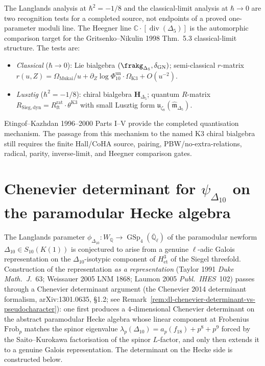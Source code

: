 \begin{remark}
\label{rem:dl-kazhdan-synthesis}
The Langlands analysis at $\hbar^2 = -1/8$ and the
classical-limit analysis at $\hbar \to 0$ are two recognition tests for
a completed source, not endpoints of a proved one-parameter moduli line.
The Heegner line $\mathbb C\cdot[\operatorname{div}(\Delta_5)]$ is the
automorphic comparison target for the Gritsenko--Nikulin 1998 Thm.~5.3
classical-limit structure. The tests are:
\begin{itemize}
 \item \emph{Classical} ($\hbar\to 0$): Lie bialgebra
 $(\frakg_{\Delta_5}, \delta_{\mathrm{GN}})$; semi-classical
 $r$-matrix $r(u, Z) = \Omega_{\mathrm{Mukai}}/u +
 \partial_Z\log\Phi_{10}^{\mathrm{un}}\cdot\Omega_{\mathrm{K3}} + O(u^{-2})$.
 \item \emph{Lusztig} ($\hbar^2 = -1/8$): chiral bialgebra
 $\mathbf H_{\Delta_5}$; quantum $R$-matrix
 $R_{\mathrm{Sieg,dyn}} = R^{\mathrm{rat}}_{\mathrm{ft}}\cdot\theta^{\mathrm{K3}}$
 with small Lusztig form
 $\mathfrak u_{\zeta_8}(\widehat{\mathfrak m}_{\Delta_5})$.
\end{itemize}
Etingof--Kazhdan 1996--2000 Parts I--V provide the completed
quantisation mechanism. The passage from this mechanism to the named
K3 chiral bialgebra still requires the finite Hall/CoHA source,
pairing, PBW/no-extra-relations, radical, parity, inverse-limit, and
Heegner comparison gates.
\end{remark}

\section{Chenevier determinant for $\psi_{\Delta_{10}}$ on the
paramodular Hecke algebra}
\label{sec:dl-gelfand-pseudocharacter}

\providecommand{\Tpar}{\mathbb{T}^{\mathrm{par}}}
\providecommand{\Sps}{D^{\mathrm{Chen}}}
\providecommand{\Gal}{\operatorname{Gal}}
\providecommand{\GSp}{\operatorname{GSp}}
\providecommand{\tr}{\operatorname{tr}}

The Langlands parameter
$\phi_{\Delta_{10}}\colon W_{\mathbb{Q}}\to\GSp_4(\overline{\mathbb{Q}}_\ell)$
of the paramodular newform $\Delta_{10}\in S_{10}(K(1))$ is conjectured to
arise from a genuine $\ell$-adic Galois representation on the
$\Delta_{10}$-isotypic component of $H^3_{\mathrm{et}}$ of the Siegel
threefold. Construction of the representation \emph{as a representation}
(Taylor 1991 \emph{Duke Math.\ J.}\ 63; Weissauer 2005 LNM 1868; Laumon
2005 \emph{Publ.\ IHES}\ 102) passes through a Chenevier determinant
argument (the Chenevier 2014 determinant formalism,
arXiv:1301.0635, \S1.2;
see Remark~\ref{rem:dl-chenevier-determinant-vs-pseudocharacter}):
one first produces a $4$-dimensional Chenevier determinant
on the abstract paramodular Hecke algebra whose linear component at
Frobenius $\mathrm{Frob}_p$ matches the spinor eigenvalue
$\lambda_p(\Delta_{10}) = a_p(f_{18}) + p^8 + p^9$ forced by the
Saito--Kurokawa factorisation of the spinor \(L\)-factor, and only
then extends it to a genuine Galois representation. The determinant
on the Hecke side is constructed below.

